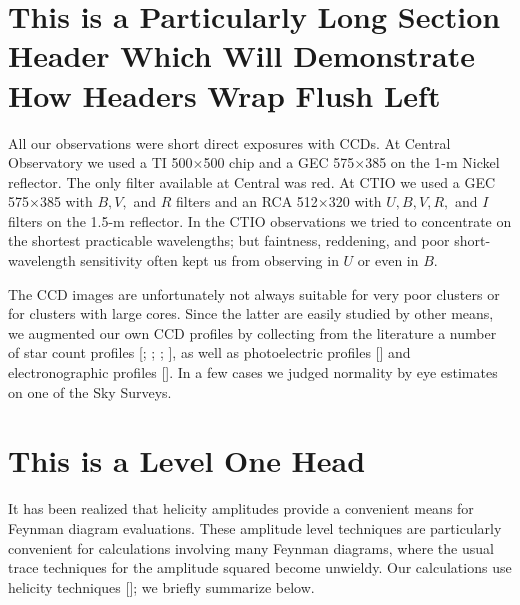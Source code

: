 \section{This is a Particularly Long Section Header Which Will 
Demonstrate How Headers Wrap Flush Left}

All our observations were short direct exposures with CCDs.  
At Central Observatory we used a TI 500$\times$500 chip and a 
GEC 575$\times$385 on the 1-m Nickel reflector.  The only 
filter available at Central was red.  At CTIO we used a GEC 
575$\times$385 with $B, V,$ and $R$ filters and an RCA 
512$\times$320 with $U, B, V, R,$ and $I$ filters on the 
1.5-m reflector.  In the CTIO observations we tried to 
concentrate on the shortest practicable wavelengths; but 
faintness, reddening, and poor short-wavelength sensitivity 
often kept us from observing in $U$ or even in $B$.  

The CCD images are unfortunately not always suitable for 
very poor clusters or for clusters with large cores.  Since 
the latter are easily studied by other means, we augmented 
our own CCD profiles by collecting from the literature a 
number of star count profiles [; ; ; ],
as well as photoelectric profiles [] 
and electronographic profiles [].  In a few cases we judged normality by eye estimates on 
one of the Sky Surveys. 


\section{This is a Level One Head}

It has been realized that helicity amplitudes provide a convenient 
means for Feynman diagram evaluations.  These amplitude level 
techniques are particularly convenient for calculations involving 
many Feynman diagrams, where the usual trace techniques for the 
amplitude squared become unwieldy.  Our calculations use helicity 
techniques []; we 
briefly summarize below.

